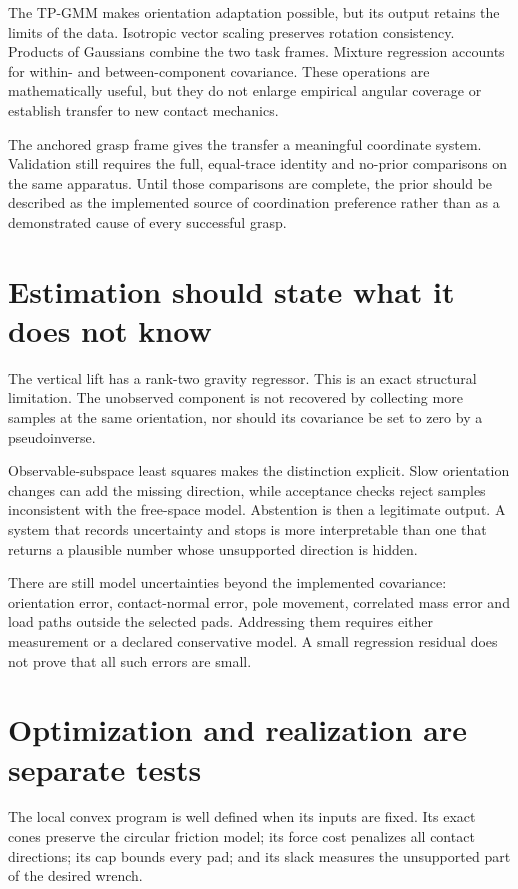 The TP-GMM makes orientation adaptation possible, but its output retains the limits of the data. Isotropic vector scaling preserves rotation consistency. Products of Gaussians combine the two task frames. Mixture regression accounts for within- and between-component covariance. These operations are mathematically useful, but they do not enlarge empirical angular coverage or establish transfer to new contact mechanics.

The anchored grasp frame gives the transfer a meaningful coordinate system. Validation still requires the full, equal-trace identity and no-prior comparisons on the same apparatus. Until those comparisons are complete, the prior should be described as the implemented source of coordination preference rather than as a demonstrated cause of every successful grasp.

\section{Estimation should state what it does not know}

The vertical lift has a rank-two gravity regressor. This is an exact structural limitation. The unobserved component is not recovered by collecting more samples at the same orientation, nor should its covariance be set to zero by a pseudoinverse.

Observable-subspace least squares makes the distinction explicit. Slow orientation changes can add the missing direction, while acceptance checks reject samples inconsistent with the free-space model. Abstention is then a legitimate output. A system that records uncertainty and stops is more interpretable than one that returns a plausible number whose unsupported direction is hidden.

There are still model uncertainties beyond the implemented covariance: orientation error, contact-normal error, pole movement, correlated mass error and load paths outside the selected pads. Addressing them requires either measurement or a declared conservative model. A small regression residual does not prove that all such errors are small.

\section{Optimization and realization are separate tests}

The local convex program is well defined when its inputs are fixed. Its exact cones preserve the circular friction model; its force cost penalizes all contact directions; its cap bounds every pad; and its slack measures the unsupported part of the desired wrench.


